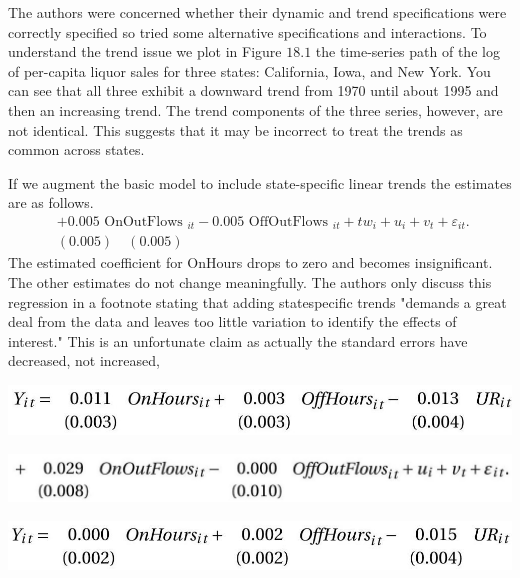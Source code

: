 \documentclass[10pt]{article}
\begin{document}
The authors were concerned whether their dynamic and trend specifications were correctly specified so tried some alternative specifications and interactions. To understand the trend issue we plot in Figure $18.1$ the time-series path of the log of per-capita liquor sales for three states: California, Iowa, and New York. You can see that all three exhibit a downward trend from 1970 until about 1995 and then an increasing trend. The trend components of the three series, however, are not identical. This suggests that it may be incorrect to treat the trends as common across states.

If we augment the basic model to include state-specific linear trends the estimates are as follows.
$$
\begin{aligned}
& +0.005 \text { OnOutFlows }{ }_{i t}-0.005 \text { OffOutFlows }{ }_{i t}+t w_{i}+u_{i}+v_{t}+\varepsilon_{i t} \text {. } \\
& (0.005) \quad(0.005)
\end{aligned}
$$
The estimated coefficient for OnHours drops to zero and becomes insignificant. The other estimates do not change meaningfully. The authors only discuss this regression in a footnote stating that adding statespecific trends "demands a great deal from the data and leaves too little variation to identify the effects of interest." This is an unfortunate claim as actually the standard errors have decreased, not increased,

\includegraphics[max width=\textwidth]{2022_10_23_b5d26ddcd2ce17e8fbc5g-10}

\includegraphics[max width=\textwidth]{2022_10_23_b5d26ddcd2ce17e8fbc5g-10(1)}

\includegraphics[max width=\textwidth]{2022_10_23_b5d26ddcd2ce17e8fbc5g-10(2)}
\end{document}
